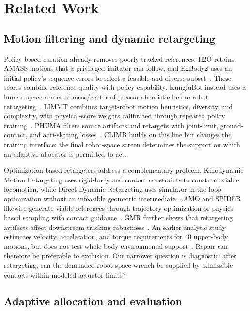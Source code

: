 \documentclass[letterpaper,10pt,conference]{ieeeconf}
\newcommand{\method}{CLIMB}
\begin{document}
\section{Related Work}

\subsection{Motion filtering and dynamic retargeting}

Policy-based curation already removes poorly tracked references. H2O retains AMASS motions that a
privileged imitator can follow, and ExBody2 uses an initial policy's sequence errors to select a
feasible and diverse subset~\cite{he2024h2o,ji2024exbody2}. These scores combine reference quality
with policy capability. KungfuBot instead uses a human-space center-of-mass/center-of-pressure
heuristic before robot retargeting~\cite{xie2025kungfubot}. LIMMT combines target-robot motion
heuristics, diversity, and complexity, with physical-score weights calibrated through repeated
policy training~\cite{guan2026limmt}. PHUMA filters source artifacts and retargets with joint-limit,
ground-contact, and anti-skating losses~\cite{lee2025phuma}. \method{} builds on this line but
changes the training interface: the final robot-space screen determines the support on which an
adaptive allocator is permitted to act.

Optimization-based retargeters address a complementary problem. Kinodynamic Motion Retargeting
uses rigid-body and contact constraints to construct viable locomotion, while Direct Dynamic
Retargeting uses simulator-in-the-loop optimization without an infeasible geometric
intermediate~\cite{zhang2026kinodynamic,roux2026direct}. AMO and SPIDER likewise generate viable
references through trajectory optimization or physics-based sampling with contact
guidance~\cite{li2025amo,pan2025spider}. GMR further shows that retargeting artifacts affect
downstream tracking robustness~\cite{araujo2025retargeting}. An earlier analytic study estimates
velocity, acceleration, and torque requirements for 40 upper-body motions, but does not test
whole-body environmental support~\cite{klas2023actuator}. Repair can therefore be preferable to
exclusion. Our narrower question is diagnostic: after retargeting, can the demanded robot-space
wrench be supplied by admissible contacts within modeled actuator limits?

\subsection{Adaptive allocation and evaluation}
\end{document}

